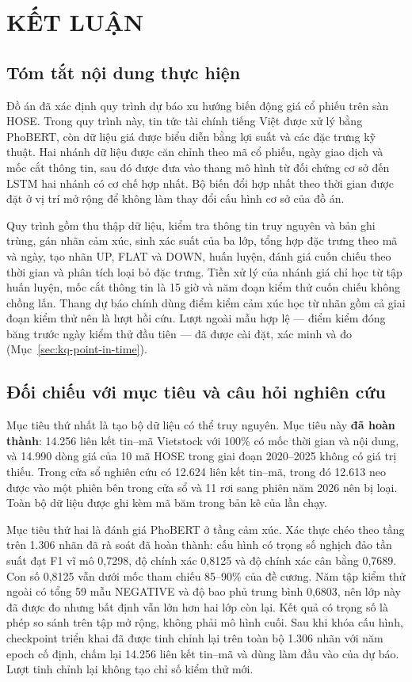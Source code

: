 \chapter{KẾT LUẬN}
\label{ch:ket-luan}

\section{Tóm tắt nội dung thực hiện}

Đồ án đã xác định quy trình dự báo xu hướng biến động giá cổ phiếu trên sàn HOSE. Trong
quy trình này, tin tức tài chính tiếng Việt được xử lý bằng PhoBERT, còn dữ liệu giá được
biểu diễn bằng lợi suất và các đặc trưng kỹ thuật. Hai nhánh dữ liệu được căn chỉnh theo
mã cổ phiếu, ngày giao dịch và mốc cắt thông tin, sau đó được đưa vào thang mô hình từ
đối chứng cơ sở đến LSTM hai nhánh có cơ chế hợp nhất. Bộ biến đổi hợp nhất theo thời gian được
đặt ở vị trí mở rộng để không làm thay đổi cấu hình cơ sở của đồ án.

Quy trình gồm thu thập dữ liệu, kiểm tra thông tin truy nguyên và bản ghi trùng, gán nhãn
cảm xúc, sinh xác suất của ba lớp, tổng hợp đặc trưng theo mã và ngày, tạo nhãn UP, FLAT
và DOWN, huấn luyện, đánh giá cuốn chiếu theo thời gian và phân tích loại bỏ đặc trưng.
Tiền xử lý của nhánh giá chỉ học từ tập huấn luyện, mốc cắt thông tin là 15 giờ và năm
đoạn kiểm thử cuốn chiếu không chồng lấn. Thang dự báo chính dùng điểm kiểm cảm xúc học từ
nhãn gồm cả giai đoạn kiểm thử nên là lượt hồi cứu. Lượt ngoài mẫu hợp lệ --- điểm
kiểm đóng băng trước ngày kiểm thử đầu tiên --- đã được cài đặt, xác minh và đo
(Mục~\ref{sec:kq-point-in-time}).

\section{Đối chiếu với mục tiêu và câu hỏi nghiên cứu}

Mục tiêu thứ nhất là tạo bộ dữ liệu có thể truy nguyên. Mục tiêu này \textbf{đã hoàn
thành}: 14.256 liên kết tin--mã Vietstock với 100\% có mốc thời gian và nội dung, và
14.990 dòng giá của 10 mã HOSE trong giai đoạn 2020--2025 không có giá trị thiếu. Trong
cửa sổ nghiên cứu có 12.624 liên kết tin--mã, trong đó 12.613 neo được vào một phiên bên
trong cửa sổ và 11 rơi sang phiên năm 2026 nên bị loại. Toàn bộ dữ liệu được ghi kèm mã băm trong bản kê của lần chạy.

Mục tiêu thứ hai là đánh giá PhoBERT ở tầng cảm xúc. Xác thực chéo theo tầng trên 1.306
nhãn đã rà soát đã hoàn thành: cấu hình có trọng số nghịch đảo tần suất đạt F1 vĩ mô
0,7298, độ chính xác 0,8125 và độ chính xác cân bằng 0,7689. Con số 0,8125 vẫn dưới mốc
tham chiếu 85--90\% của đề cương. Năm tập kiểm thử ngoài có tổng 59 mẫu NEGATIVE và độ
bao phủ trung bình 0,6803, nên lớp này đã được đo nhưng bất định vẫn lớn hơn hai lớp
còn lại. Kết quả có trọng số là phép so sánh trên tập mở rộng, không phải mô hình cuối.
Sau khi khóa cấu hình, checkpoint triển khai đã được tinh chỉnh lại trên toàn bộ 1.306
nhãn với năm epoch cố định, chấm lại 14.256 liên kết tin--mã và dùng làm đầu vào của dự báo.
Lượt tinh chỉnh lại không tạo chỉ số kiểm thử mới.

